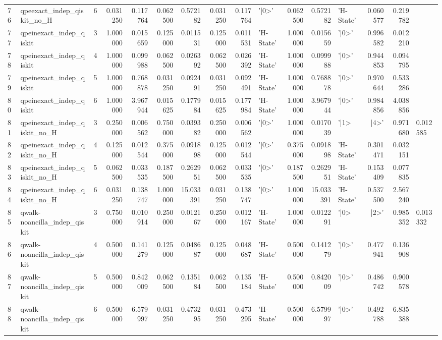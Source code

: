 \begin{table}
\begin{tabular}{llrrrrrrrlrrlrr}
76 & qpeexact_indep_qiskit_no_H & 6 & 0.031250 & 0.117764 & 0.062500 & 0.572182 & 0.031250 & 0.117764 & '|0>' & 0.062500 & 0.572182 & 'H-State' & 0.060577 & 0.219782 \\
77 & qpeinexact_indep_qiskit & 3 & 1.000000 & 0.015659 & 0.125000 & 0.011531 & 0.125000 & 0.011531 & 'H-State' & 1.000000 & 0.015659 & '|0>' & 0.996582 & 0.012210 \\
78 & qpeinexact_indep_qiskit & 4 & 1.000000 & 0.099988 & 0.062500 & 0.026392 & 0.062500 & 0.026392 & 'H-State' & 1.000000 & 0.099988 & '|0>' & 0.944853 & 0.094795 \\
79 & qpeinexact_indep_qiskit & 5 & 1.000000 & 0.768878 & 0.031250 & 0.092491 & 0.031250 & 0.092491 & 'H-State' & 1.000000 & 0.768878 & '|0>' & 0.970644 & 0.533286 \\
80 & qpeinexact_indep_qiskit & 6 & 1.000000 & 3.967944 & 0.015625 & 0.177984 & 0.015625 & 0.177984 & 'H-State' & 1.000000 & 3.967944 & '|0>' & 0.984856 & 4.038856 \\
81 & qpeinexact_indep_qiskit_no_H & 3 & 0.250000 & 0.006562 & 0.750000 & 0.039382 & 0.250000 & 0.006562 & '|0>' & 1.000000 & 0.017039 & '|1> & |4>' & 0.971680 & 0.012585 \\
82 & qpeinexact_indep_qiskit_no_H & 4 & 0.125000 & 0.012544 & 0.375000 & 0.091898 & 0.125000 & 0.012544 & '|0>' & 0.375000 & 0.091898 & 'H-State' & 0.301471 & 0.032151 \\
83 & qpeinexact_indep_qiskit_no_H & 5 & 0.062500 & 0.033535 & 0.187500 & 0.262951 & 0.062500 & 0.033535 & '|0>' & 0.187500 & 0.262951 & 'H-State' & 0.153409 & 0.077835 \\
84 & qpeinexact_indep_qiskit_no_H & 6 & 0.031250 & 0.138747 & 1.000000 & 15.033391 & 0.031250 & 0.138747 & '|0>' & 1.000000 & 15.033391 & 'H-State' & 0.537500 & 2.567240 \\
85 & qwalk-noancilla_indep_qiskit & 3 & 0.750000 & 0.010914 & 0.250000 & 0.012167 & 0.250000 & 0.012167 & 'H-State' & 1.000000 & 0.012291 & '|0> & |2>' & 0.985352 & 0.013332 \\
86 & qwalk-noancilla_indep_qiskit & 4 & 0.500000 & 0.141279 & 0.125000 & 0.048687 & 0.125000 & 0.048687 & 'H-State' & 0.500000 & 0.141279 & '|0>' & 0.477941 & 0.136908 \\
87 & qwalk-noancilla_indep_qiskit & 5 & 0.500000 & 0.842009 & 0.062500 & 0.135184 & 0.062500 & 0.135184 & 'H-State' & 0.500000 & 0.842009 & '|0>' & 0.486742 & 0.900578 \\
88 & qwalk-noancilla_indep_qiskit & 6 & 0.500000 & 6.579997 & 0.031250 & 0.473295 & 0.031250 & 0.473295 & 'H-State' & 0.500000 & 6.579997 & '|0>' & 0.492788 & 6.835388 \\

\end{tabular}
\end{table}
